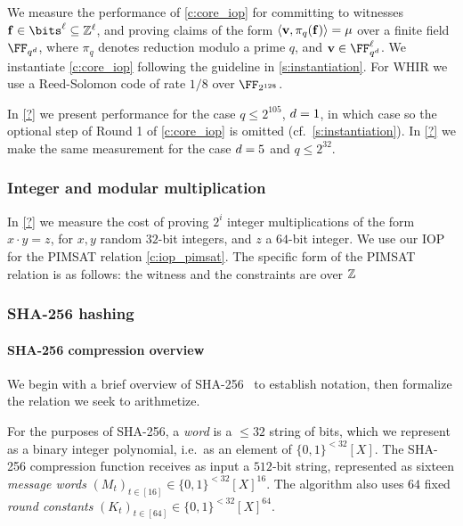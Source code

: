 \documentclass[11pt,letterpaper,usenames,dvipsnames]{article}
\begin{document}
We measure the performance of \cref{c:core_iop} for committing  to witnesses $\bff\in \bits^{\ell} \subseteq \ZZ^{\ell}$,  and proving claims of the form $\langle \mathbf{v}, \pi_q(\mathbf{f})\rangle = \mu$ over a finite field $\FF_{q^\moduledegree}$, where $\pi_q$ denotes reduction modulo a prime $q$, and $\vv\in \FF_{q^\moduledegree}^{\ell}$.  We instantiate \cref{c:core_iop} following the guideline in \cref{s:instantiation}. 
 For WHIR we use a Reed-Solomon code of rate $1/8$ over $\FF_{2^{128}}$. 
 
 
 In \cref{?} we present performance for the case $q\leq 2^{105}$, $d=1$, in which case  so the optional step of Round 1 of \cref{c:core_iop} is omitted (cf.\ \cref{s:instantiation}). In \cref{?} we make the same measurement for the case $d=5$ and $q\leq 2^{32}$. 




\subsubsection{Integer and modular multiplication}

In \cref{?} we measure the cost of proving $2^i$ integer multiplications of the form $x\cdot  y = z$, for $x,y$ random $32$-bit integers, and $z$ a $64$-bit integer. We use our IOP for the PIMSAT relation  \cref{c:iop_pimsat}. The specific form of the PIMSAT relation is as follows: the witness and the constraints are over $\mathbb{Z}$



\subsubsection{SHA-256 hashing}


\paragraph{SHA-256 compression overview}
We begin with a brief overview of SHA-256~\cite{FIPS180-4} to establish
notation, then formalize the relation we seek to arithmetize.



For the purposes of SHA-256, a \emph{word} is a $\leq 32$ string of bits, which we represent as a binary integer polynomial, i.e.\ as an element of $\{0,1\}^{<32}[X]$.
The SHA-256 compression function receives as input a $512$-bit string, represented as sixteen \emph{message words} $(M_t)_{t\in[16]}\in\{0,1\}^{<32}[X]^{16}$. 
The algorithm also uses $64$ fixed \emph{round constants} $(K_t)_{t\in[64]}\in\{0,1\}^{<32}[X]^{64}$. 
\end{document}
